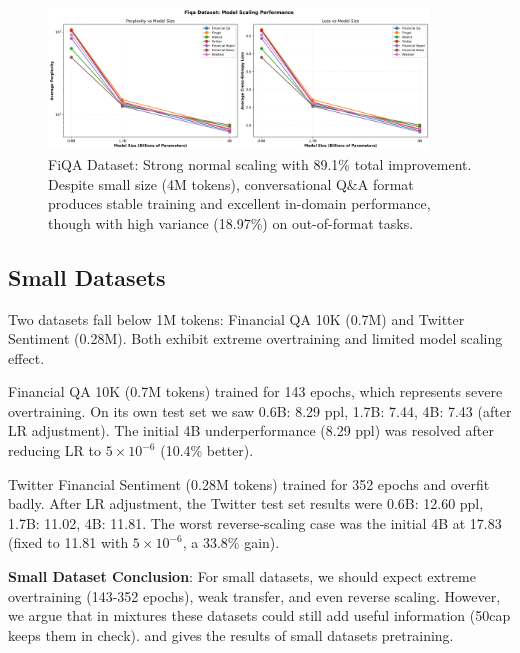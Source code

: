 \begin{figure}[htbp]
\centering
\includegraphics[width=0.9\textwidth]{figures/scaling_fiqa.png}
\caption[FiQA Dataset: Scaling Behavior]{FiQA Dataset: Strong normal scaling with 89.1\% total improvement. Despite small size (4M tokens), conversational Q\&A format produces stable training and excellent in-domain performance, though with high variance (18.97\%) on out-of-format tasks.}
\label{fig:scaling_fiqa}
\end{figure}







\subsection{Small Datasets}

Two datasets fall below 1M tokens: Financial QA 10K (0.7M) and Twitter Sentiment (0.28M). Both exhibit extreme overtraining and limited model scaling effect.

Financial QA 10K (0.7M tokens) trained for 143 epochs, which represents severe overtraining. On its own test set we saw 0.6B: 8.29 ppl, 1.7B: 7.44, 4B: 7.43 (after LR adjustment). The initial 4B underperformance (8.29 ppl) was resolved after reducing LR to $5\times10^{-6}$ (10.4\% better).

Twitter Financial Sentiment (0.28M tokens) trained for 352 epochs and overfit badly. After LR adjustment, the Twitter test set results were 0.6B: 12.60 ppl, 1.7B: 11.02, 4B: 11.81. The worst reverse‑scaling case was the initial 4B at 17.83 (fixed to 11.81 with $5\times10^{-6}$, a 33.8\% gain).

\textbf{Small Dataset Conclusion}: For small datasets, we should expect extreme overtraining (143-352 epochs), weak transfer, and even reverse scaling. However, we argue that in mixtures these datasets could still add useful information (50cap keeps them in check).  and  gives the results of small datasets pretraining.

